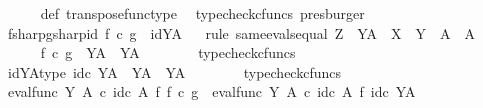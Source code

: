\begin{isabellebody}
\ \ \ \ \isamarkupfalse%
\ {\isasymphi}{\isacharunderscore}{\kern0pt}def\ transpose{\isacharunderscore}{\kern0pt}func{\isacharunderscore}{\kern0pt}type\ \isamarkupfalse%
\ {\isacharparenleft}{\kern0pt}typecheck{\isacharunderscore}{\kern0pt}cfuncs{\isacharcomma}{\kern0pt}\ presburger{\isacharparenright}{\kern0pt}\isanewline
\isanewline
\ \ \isamarkupfalse%
\ fsharp{\isacharunderscore}{\kern0pt}gsharp{\isacharunderscore}{\kern0pt}id{\isacharcolon}{\kern0pt}\ {\isachardoublequoteopen}f\isactrlsup {\isasymsharp}\ {\isasymcirc}\isactrlsub c\ g\isactrlsup {\isasymsharp}\ {\isacharequal}{\kern0pt}\ id{\isacharparenleft}{\kern0pt}Y\isactrlbsup A\isactrlesup {\isacharparenright}{\kern0pt}{\isachardoublequoteclose}\isanewline
\ \ \isamarkupfalse%
{\isacharparenleft}{\kern0pt}rule\ same{\isacharunderscore}{\kern0pt}evals{\isacharunderscore}{\kern0pt}equal{\isacharbrackleft}{\kern0pt}\ Z\ {\isacharequal}{\kern0pt}\ {\isachardoublequoteopen}Y\isactrlbsup A\isactrlesup {\isachardoublequoteclose}{\isacharcomma}{\kern0pt}\ \ X\ {\isacharequal}{\kern0pt}\ Y{\isacharcomma}{\kern0pt}\ \ A\ {\isacharequal}{\kern0pt}\ A{\isacharbrackright}{\kern0pt}{\isacharparenright}{\kern0pt}\isanewline
\ \ \ \ \isamarkupfalse%
\ {\isachardoublequoteopen}f\isactrlsup {\isasymsharp}\ {\isasymcirc}\isactrlsub c\ g\isactrlsup {\isasymsharp}\ {\isacharcolon}{\kern0pt}\ Y\isactrlbsup A\isactrlesup \ {\isasymrightarrow}\ Y\isactrlbsup A\isactrlesup {\isachardoublequoteclose}\isanewline
\ \ \ \ \ \ \isamarkupfalse%
\ typecheck{\isacharunderscore}{\kern0pt}cfuncs\isanewline
\ \ \ \ \isamarkupfalse%
\ idYA{\isacharunderscore}{\kern0pt}type{\isacharcolon}{\kern0pt}\ {\isachardoublequoteopen}id\isactrlsub c\ {\isacharparenleft}{\kern0pt}Y\isactrlbsup A\isactrlesup {\isacharparenright}{\kern0pt}\ {\isacharcolon}{\kern0pt}\ Y\isactrlbsup A\isactrlesup \ {\isasymrightarrow}\ Y\isactrlbsup A\isactrlesup {\isachardoublequoteclose}\isanewline
\ \ \ \ \ \ \isamarkupfalse%
\ typecheck{\isacharunderscore}{\kern0pt}cfuncs\isanewline
\ \ \ \ \isamarkupfalse%
\ {\isachardoublequoteopen}eval{\isacharunderscore}{\kern0pt}func\ Y\ A\ {\isasymcirc}\isactrlsub c\ id\isactrlsub c\ A\ {\isasymtimes}\isactrlsub f\ f\isactrlsup {\isasymsharp}\ {\isasymcirc}\isactrlsub c\ g\isactrlsup {\isasymsharp}\ {\isacharequal}{\kern0pt}\ eval{\isacharunderscore}{\kern0pt}func\ Y\ A\ {\isasymcirc}\isactrlsub c\ id\isactrlsub c\ A\ {\isasymtimes}\isactrlsub f\ id\isactrlsub c\ {\isacharparenleft}{\kern0pt}Y\isactrlbsup A\isactrlesup {\isacharparenright}{\kern0pt}{\isachardoublequoteclose}\isanewline

\end{isabellebody}
